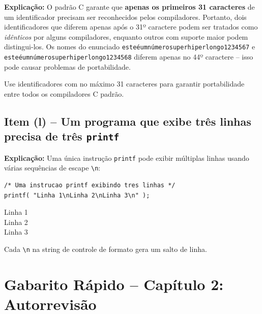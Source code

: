 \documentclass[12pt,a4paper]{article}
\begin{document}
\begin{tcolorbox}[colback=red!5,colframe=deitelred,title={\bfseries FALSO}]
\textbf{Explicação:} O padrão C garante que \textbf{apenas os primeiros 31 caracteres}
de um identificador precisam ser reconhecidos pelos compiladores. Portanto, dois
identificadores que diferem apenas após o 31º caractere podem ser tratados como
\textit{idênticos} por alguns compiladores, enquanto outros com suporte maior podem
distingui-los. Os nomes do enunciado \texttt{esteéumnúmerosuperhiperlongo1234567} e
\texttt{esteéumnúmerosuperhiperlongo1234568} diferem apenas no 44º caractere -- isso
pode causar problemas de portabilidade.

\begin{boaprática}
  Use identificadores com no máximo 31 caracteres para garantir portabilidade
  entre todos os compiladores C padrão.
\end{boaprática}
\end{tcolorbox}

\subsection*{Item (l) -- Um programa que exibe três linhas precisa de três \texttt{printf}}

\begin{tcolorbox}[colback=red!5,colframe=deitelred,title={\bfseries FALSO}]
\textbf{Explicação:} Uma única instrução \texttt{printf} pode exibir múltiplas linhas
usando várias sequências de escape \texttt{\textbackslash n}:

\begin{lstlisting}
/* Uma instrucao printf exibindo tres linhas */
printf( "Linha 1\nLinha 2\nLinha 3\n" );
\end{lstlisting}

\begin{saida}
Linha 1\\
Linha 2\\
Linha 3
\end{saida}

Cada \texttt{\textbackslash n} na string de controle de formato gera um salto de linha.
\end{tcolorbox}

\newpage
\section*{Gabarito Rápido -- Capítulo 2: Autorrevisão}
\end{document}
